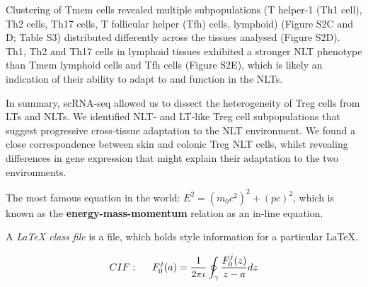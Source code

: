 Clustering of Tmem cells revealed multiple subpopulations (T helper-1 (Th1 cell), Th2 cells, Th17 cells, T follicular helper (Tfh) cells, lymphoid) (Figure S2C and D; Table S3) distributed differently across the tissues analysed (Figure S2D). Th1, Th2 and Th17 cells in lymphoid tissues exhibited a stronger NLT phenotype than Tmem lymphoid cells and Tfh cells (Figure S2E), which is likely an indication of their ability to adapt to and function in the NLTs.

In summary, scRNA-seq allowed us to dissect the heterogeneity of Treg cells from LTs and NLTs. We identified NLT- and LT-like Treg cell subpopulations that suggest progressive cross-tissue adaptation to the NLT environment. We found a close correspondence between skin and colonic Treg NLT cells, whilst revealing differences in gene expression that might explain their adaptation to the two environments.











The most famous equation in the world: $E^2 = (m_0c^2)^2 + (pc)^2$, which is 
known as the \textbf{energy-mass-momentum} relation as an in-line equation.

A {\em \LaTeX{} class file} is a file, which holds style information for a particular \LaTeX{}.

\begin{align}
CIF: \hspace*{5mm}F_0^j(a) = \frac{1}{2\pi \iota} \oint_{\gamma} \frac{F_0^j(z)}{z - a} dz
\end{align}

\nomenclature[g-p]{$\pi$}{ $\simeq 3.14\ldots$}                                             %


